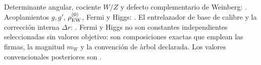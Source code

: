 \begin{statusbox}
Determinante angular, cociente \(W/Z\) y defecto complementario de Weinberg:
. Acoplamientos \(g,g'\),
\(\rho_{\rm EW}^{(0)}\), Fermi y Higgs: . El entrelazador de base de calibre y la
correcci\'on interna \(\Delta r\): .
Fermi y Higgs no son constantes independientes seleccionadas sin valores
objetivo: son composiciones exactas que emplean las firmas, la magnitud
\(m_W\) y la
convenci\'on de \`arbol declarada. Los valores convencionales posteriores
son .
\end{statusbox}

